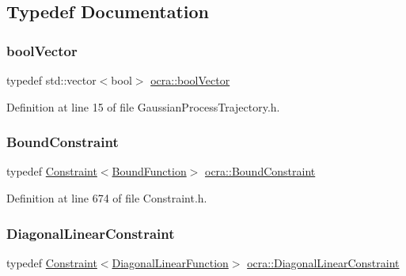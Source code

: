 \subsection{Typedef Documentation}
\hypertarget{namespaceocra_afaf4559cfedb560f8d1fe9bf6a21678f}{}\label{namespaceocra_afaf4559cfedb560f8d1fe9bf6a21678f} 
\subsubsection{\texorpdfstring{bool\+Vector}{boolVector}}
{\footnotesize\ttfamily typedef std\+::vector$<$bool$>$ \hyperlink{namespaceocra_afaf4559cfedb560f8d1fe9bf6a21678f}{ocra\+::bool\+Vector}}



Definition at line 15 of file Gaussian\+Process\+Trajectory.\+h.

\hypertarget{namespaceocra_a6e55fff77635080219964abc301abf18}{}\label{namespaceocra_a6e55fff77635080219964abc301abf18} 
\subsubsection{\texorpdfstring{Bound\+Constraint}{BoundConstraint}}
{\footnotesize\ttfamily typedef \hyperlink{classocra_1_1Constraint}{Constraint}$<$\hyperlink{classocra_1_1BoundFunction}{Bound\+Function}$>$ \hyperlink{namespaceocra_a6e55fff77635080219964abc301abf18}{ocra\+::\+Bound\+Constraint}}



Definition at line 674 of file Constraint.\+h.

\hypertarget{namespaceocra_ab310e2c53f5e52ec3aba0a832f7dc79e}{}\label{namespaceocra_ab310e2c53f5e52ec3aba0a832f7dc79e} 
\subsubsection{\texorpdfstring{Diagonal\+Linear\+Constraint}{DiagonalLinearConstraint}}
{\footnotesize\ttfamily typedef \hyperlink{classocra_1_1Constraint}{Constraint}$<$\hyperlink{classocra_1_1DiagonalLinearFunction}{Diagonal\+Linear\+Function}$>$ \hyperlink{namespaceocra_ab310e2c53f5e52ec3aba0a832f7dc79e}{ocra\+::\+Diagonal\+Linear\+Constraint}}



